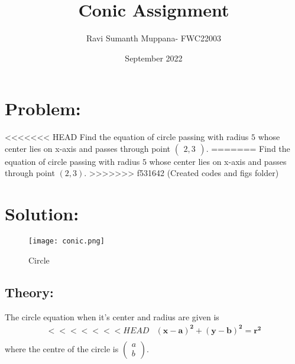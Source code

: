 \documentclass[a4paper,12pt,twocolumn]{article}
\title{Conic Assignment}
\author{Ravi Sumanth Muppana- FWC22003}
\date{September 2022}
\let\vec\mathbf
\newcommand{\myvec}[1]{\ensuremath{\begin{pmatrix}#1\end{pmatrix}}}
\begin{document}
\maketitle
\section{Problem:}
<<<<<<< HEAD
Find the equation of circle passing with radius $5$ whose center lies on x-axis and passes through point $\myvec{2,3}$.
=======
Find the equation of circle passing with radius $5$ whose center lies on x-axis and passes through point $(2,3)$.
>>>>>>> f531642 (Created codes and figs folder)
\maketitle
\section{Solution:}
\begin{figure}[h]
	\texttt{[image: conic.png]}
\caption{Circle}
\end{figure}
\subsection{Theory:}
The circle equation when it's center and radius are given is
\begin{align}
<<<<<<< HEAD
	&\vec{(x-a)^2} + \vec{(y-b)^2} = \vec{r^2}\\
\end{align}
where the centre of the circle is $\myvec{a\\b}$.
\end{document}
